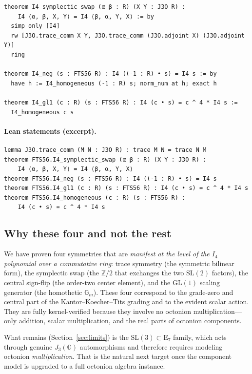\documentclass[11pt]{article}
\theoremstyle{definition}
\newcommand{\OO}{\mathbb{O}}
\newcommand{\Jthree}{J_3(\OO)}
\newcommand{\Iq}{I_4}
\newcommand{\Eseven}{\mathrm{E}_7}
\begin{document}
\begin{lstlisting}[language=leanL,caption={The E7 generator symmetries
  (GKN\_I4\_State56\_CommRing.lean).}]
theorem I4_symplectic_swap (α β : R) (X Y : J3O R) :
    I4 ⟨α, β, X, Y⟩ = I4 ⟨β, α, Y, X⟩ := by
  simp only [I4]
  rw [J3O.trace_comm X Y, J3O.trace_comm (J3O.adjoint X) (J3O.adjoint Y)]
  ring

theorem I4_neg (s : FTS56 R) : I4 ((-1 : R) • s) = I4 s := by
  have h := I4_homogeneous (-1 : R) s; norm_num at h; exact h

theorem I4_gl1 (c : R) (s : FTS56 R) : I4 (c • s) = c ^ 4 * I4 s :=
  I4_homogeneous c s
\end{lstlisting}

\paragraph{Lean statements (excerpt).}
\begin{lstlisting}[language=leanL]
lemma J3O.trace_comm (M N : J3O R) : trace M N = trace N M
theorem FTS56.I4_symplectic_swap (α β : R) (X Y : J3O R) :
    I4 ⟨α, β, X, Y⟩ = I4 ⟨β, α, Y, X⟩
theorem FTS56.I4_neg (s : FTS56 R) : I4 ((-1 : R) • s) = I4 s
theorem FTS56.I4_gl1 (c : R) (s : FTS56 R) : I4 (c • s) = c ^ 4 * I4 s
theorem FTS56.I4_homogeneous (c : R) (s : FTS56 R) :
    I4 (c • s) = c ^ 4 * I4 s
\end{lstlisting}

\subsection{Why these four and not the rest}
\label{sec:fts56-which}

We have proven four symmetries that are \emph{manifest at the level of the
$\Iq$ polynomial over a commutative ring}: trace symmetry (the symmetric bilinear
form), the symplectic swap (the $\mathbb{Z}/2$ that exchanges the two
$\mathrm{SL}(2)$ factors), the central sign-flip (the order-two center element),
and the $\mathrm{GL}(1)$ scaling generator (the homothetic $\mathbb{G}_m$).
These four correspond to the grade-zero and central part of the
Kantor--Koecher--Tits grading and to the evident scalar action. They are fully
kernel-verified because they involve no octonion multiplication---only
addition, scalar multiplication, and the real parts of octonion components.

What remains (Section~\ref{sec:limits}) is the $\mathrm{SL}(3)\subset\Eseven$
family, which acts through genuine $\Jthree$ automorphisms and therefore
requires modeling octonion \emph{multiplication}. That is the natural next
target once the component model is upgraded to a full octonion algebra
instance.
\end{document}
